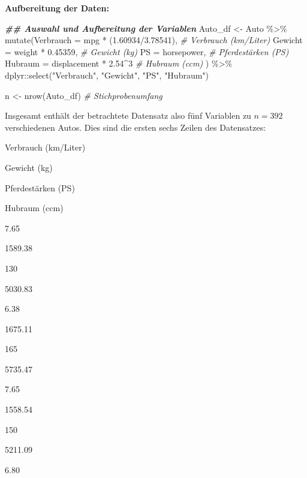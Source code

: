 \documentclass[
  ngerman,
]{book}
\newenvironment{Shaded}{\begin{snugshade}}{\end{snugshade}}
\newcommand{\AttributeTok}[1]{\textcolor[rgb]{0.77,0.63,0.00}{#1}}
\newcommand{\CommentTok}[1]{\textcolor[rgb]{0.56,0.35,0.01}{\textit{#1}}}
\newcommand{\DecValTok}[1]{\textcolor[rgb]{0.00,0.00,0.81}{#1}}
\newcommand{\DocumentationTok}[1]{\textcolor[rgb]{0.56,0.35,0.01}{\textbf{\textit{#1}}}}
\newcommand{\FloatTok}[1]{\textcolor[rgb]{0.00,0.00,0.81}{#1}}
\newcommand{\FunctionTok}[1]{\textcolor[rgb]{0.00,0.00,0.00}{#1}}
\newcommand{\NormalTok}[1]{#1}
\newcommand{\OtherTok}[1]{\textcolor[rgb]{0.56,0.35,0.01}{#1}}
\newcommand{\SpecialCharTok}[1]{\textcolor[rgb]{0.00,0.00,0.00}{#1}}
\newcommand{\StringTok}[1]{\textcolor[rgb]{0.31,0.60,0.02}{#1}}
\begin{document}
\textbf{Aufbereitung der Daten:}

\begin{Shaded}
\begin{Highlighting}[]
\DocumentationTok{\#\# Auswahl und Aufbereitung der Variablen }
\NormalTok{Auto\_df }\OtherTok{\textless{}{-}}\NormalTok{ Auto }\SpecialCharTok{\%\textgreater{}\%} 
  \FunctionTok{mutate}\NormalTok{(}\AttributeTok{Verbrauch =}\NormalTok{ mpg }\SpecialCharTok{*}\NormalTok{ (}\FloatTok{1.60934}\SpecialCharTok{/}\FloatTok{3.78541}\NormalTok{), }\CommentTok{\# Verbrauch (km/Liter)}
         \AttributeTok{Gewicht   =}\NormalTok{ weight }\SpecialCharTok{*} \FloatTok{0.45359}\NormalTok{,        }\CommentTok{\# Gewicht (kg)}
         \AttributeTok{PS        =}\NormalTok{ horsepower,              }\CommentTok{\# Pferdestärken (PS)}
         \AttributeTok{Hubraum   =}\NormalTok{ displacement }\SpecialCharTok{*} \FloatTok{2.54}\SpecialCharTok{\^{}}\DecValTok{3}    \CommentTok{\# Hubraum (ccm)}
\NormalTok{         ) }\SpecialCharTok{\%\textgreater{}\%}   
\NormalTok{ dplyr}\SpecialCharTok{::}\FunctionTok{select}\NormalTok{(}\StringTok{"Verbrauch"}\NormalTok{, }\StringTok{"Gewicht"}\NormalTok{, }\StringTok{"PS"}\NormalTok{, }\StringTok{"Hubraum"}\NormalTok{) }

\NormalTok{n }\OtherTok{\textless{}{-}} \FunctionTok{nrow}\NormalTok{(Auto\_df) }\CommentTok{\# Stichprobenumfang }
\end{Highlighting}
\end{Shaded}

Insgesamt enthält der betrachtete Datensatz also fünf Variablen zu \(n=392\) verschiedenen Autos. Dies sind die ersten sechs Zeilen des Datensatzes:

Verbrauch (km/Liter)

Gewicht (kg)

Pferdestärken (PS)

Hubraum (ccm)

7.65

1589.38

130

5030.83

6.38

1675.11

165

5735.47

7.65

1558.54

150

5211.09

6.80
\end{document}
